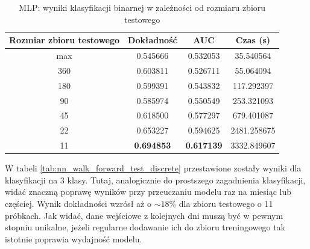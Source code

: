 \documentclass[a4paper, twoside, 11pt, openright]{article}
\begin{document}
\begin{table}[H]
    \centering
    \begin{tabular}{|c|c|c|c|}
    \hline
        \textbf{Rozmiar zbioru testowego} & \textbf{Dokładność} &  \textbf{AUC} &  \textbf{Czas (s)} \\ \hline 
max                           &  0.545666 &  0.532053 &   35.540564 \\  \hline
360                         &  0.603811 &  0.526711 &    55.064094 \\  \hline
180                         &  0.599391 &  0.543832 &   117.292397 \\  \hline
90                         &  0.585974 &  0.550549 &   253.321093 \\  \hline
45                         &  0.618500 &  0.577297 &   679.401087 \\  \hline
22                          &  0.653227 &  0.594625 &  2481.258675 \\  \hline
11                          &  \textbf{0.694853} &  \textbf{0.617139} &  3332.849607 \\ \hline
    \end{tabular}
    \caption{MLP: wyniki klasyfikacji binarnej w zależności od rozmiaru zbioru testowego}
    \label{tab:nn_walk_forward_test_binary}
\end{table}

W tabeli \ref{tab:nn_walk_forward_test_discrete} przestawione zostały wyniki dla klasyfikacji na 3 klasy. Tutaj, analogicznie do prostszego zagadnienia klasyfikacji, widać znaczną poprawę wyników przy przeuczaniu modelu raz na miesiąc lub częściej. Wynik dokładności wzrósł aż o $\sim 18\%$ dla zbioru testowego o 11 próbkach. Jak widać, dane wejściowe z kolejnych dni muszą być w pewnym stopniu unikalne, jeżeli regularne dodawanie ich do zbioru treningowego tak istotnie poprawia wydajność modelu.
\end{document}
